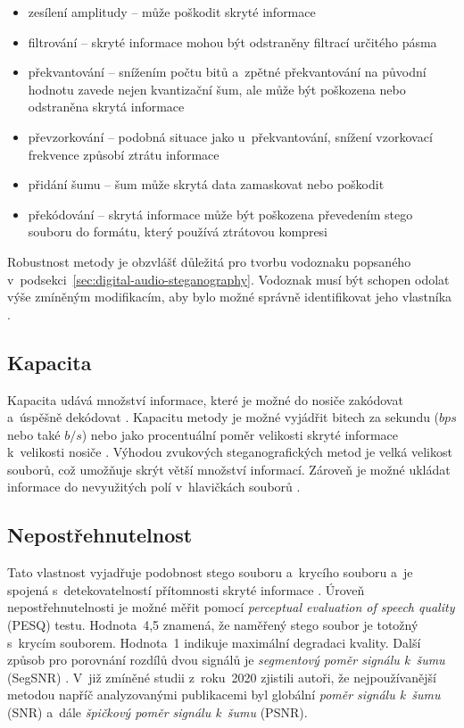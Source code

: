 \begin{itemize}
    \item zesílení amplitudy -- může poškodit skryté informace
    \item filtrování -- skryté informace mohou být odstraněny filtrací určitého
        pásma
    \item překvantování -- snížením počtu bitů a~zpětné překvantování na
        původní hodnotu zavede nejen kvantizační šum, ale může být poškozena
        nebo odstraněna skrytá informace
    \item převzorkování -- podobná situace jako u~překvantování, snížení
        vzorkovací frekvence způsobí ztrátu informace
    \item přidání šumu -- šum může skrytá data zamaskovat nebo poškodit
    \item překódování -- skrytá informace může být poškozena převedením stego
        souboru do formátu, který používá ztrátovou kompresi
\end{itemize}

Robustnost metody je obzvlášť důležitá pro tvorbu vodoznaku popsaného
v~podsekci~\ref{sec:digital-audio-steganography}. Vodoznak musí být schopen odolat výše
zmíněným modifikacím, aby bylo možné správně identifikovat jeho vlastníka
\cite{Swanson1998}.

\subsection*{Kapacita}
\label{sub:capacity}

Kapacita udává množství informace, které je možné do nosiče zakódovat a~úspěšně
dekódovat \cite{Dutta2020}\cite{Djebbar2012}. Kapacitu metody je možné vyjádřit
bitech za sekundu ($bps$ nebo také $b/s$) nebo jako procentuální poměr
velikosti skryté informace k~velikosti nosiče
\cite{AlSabhany2020}\cite{Dutta2020}. Výhodou zvukových steganografických metod
je velká velikost souborů, což umožňuje skrýt větší množství informací. Zároveň
je možné ukládat informace do nevyužitých polí v~hlavičkách souborů
\cite{Dutta2020}.

\subsection*{Nepostřehnutelnost}
\label{sub:imperceptibility}

Tato vlastnost vyjadřuje podobnost stego souboru a~krycího souboru a~je spojená
s~detekovatelností přítomnosti skryté informace \cite{AlSabhany2020}. Úroveň
nepostřehnutelnosti je možné měřit pomocí \textit{perceptual evaluation of
speech quality} (PESQ) testu. Hodnota~4,5 znamená, že naměřený stego soubor je
totožný s~krycím souborem. Hodnota~1 indikuje maximální degradaci kvality.
Další způsob pro porovnání rozdílů dvou signálů je \textit{segmentový poměr
signálu k~šumu} (SegSNR) \cite{Djebbar2012}. V~již zmíněné studii z~roku~2020
\cite{AlSabhany2020} zjistili autoři, že nejpoužívanější metodou napříč
analyzovanými publikacemi byl globální \textit{poměr signálu k~šumu} (SNR)
a~dále \textit{špičkový poměr signálu k~šumu} (PSNR).

